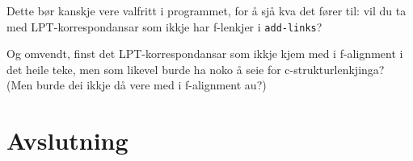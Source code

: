 \documentclass[11pt,a4paper,oneside,draft]{book}
\begin{document}
    Dette bør kanskje vere valfritt i programmet, for å sjå kva det
    fører til: vil du ta med LPT-korrespondansar som ikkje har
    f-lenkjer i \texttt{add-links}?

    Og omvendt, finst det LPT-korrespondansar som ikkje kjem med i
    f-alignment i det heile teke, men som likevel burde ha noko å seie
    for c-strukturlenkjinga? (Men burde dei ikkje då vere med i
    f-alignment au?)



\chapter{Avslutning}
\label{sec-5}




\end{document}
